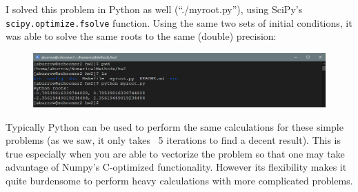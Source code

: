 \documentclass[12pt]{article}
\begin{document}
I solved this problem in Python as well (``./myroot.py''), using SciPy's
\texttt{scipy.optimize.fsolve} function. Using the same two sets of initial
conditions, it was able to solve the same roots to the same (double) precision:
\begin{figure}[H]
    \centering
    \includegraphics[width=1.0\textwidth]{python}
    \label{fig:python}
\end{figure}

Typically Python can be used to perform the same calculations for these simple
problems (as we saw, it only takes ~5 iterations to find a decent result). This
is true especially when you are able to vectorize the problem so that one may
take advantage of Numpy's C-optimized functionality. However its flexibility
makes it quite burdensome to perform heavy calculations with more complicated
problems.
\end{document}
